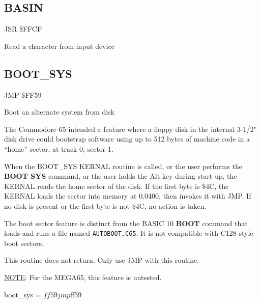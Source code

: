 \subsection{BASIN}
\label{KERNAL Jump Table!BASIN}
\begin{description}[leftmargin=2cm,style=nextline]
    \item [Address:] JSR \$FFCF
    \item [Description:] Read a character from input device
    \item [Inputs:]
    \item [Outputs:]
    \item [Remarks:]
    \item [Example:]
\end{description}



\newpage
\subsection{BOOT{\_}SYS}
\label{KERNAL Jump Table!BOOT_SYS}
\begin{description}[leftmargin=2cm,style=nextline]
    \item [Address:] JMP \$FF59
    \item [Description:] Boot an alternate system from disk
    \item [Remarks:]
        The Commodore 65 intended a feature where a floppy disk in the internal 3-1/2" disk drive could bootstrap software using up to 512 bytes of machine code in a ``home'' sector, at track 0, sector 1.

        When the BOOT\_SYS KERNAL routine is called, or the user performs the \textbf{BOOT SYS} command, or the user holds the Alt key during start-up, the KERNAL reads the home sector of the disk. If the first byte is \$4C, the KERNAL loads the sector into memory at 0.0400, then invokes it with JMP. If no disk is present or the first byte is not \$4C, no action is taken.

        The boot sector feature is distinct from the BASIC 10 \textbf{BOOT} command that loads and runs a file named \texttt{AUTOBOOT.C65}. It is not compatible with C128-style boot sectors.

        This routine does not return. Only use JMP with this routine.

        \underline{NOTE}: For the MEGA65, this feature is untested.
    \item [Example:]
        \begin{asmcode}
boot_sys = $ff59

    jmp $ff59
        \end{asmcode}

\end{description}


